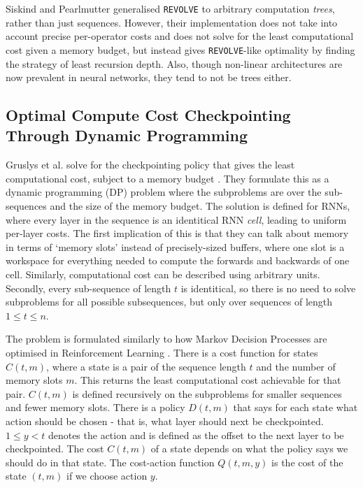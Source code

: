 Siskind and Pearlmutter \cite{Siskind2018} generalised \texttt{REVOLVE} to arbitrary computation \textit{trees}, rather than just sequences.
However, their implementation does not take into account precise per-operator costs and does not solve for the least computational cost given a memory budget, but instead gives \texttt{REVOLVE}-like optimality by finding the strategy of least recursion depth.
Also, though non-linear architectures are now prevalent in neural networks, they tend to not be trees either.

\subsection{Optimal Compute Cost Checkpointing Through Dynamic Programming} \label{sec:2-5-dp-checkpointing}
Gruslys et al. solve for the checkpointing policy that gives the least computational cost, subject to a memory budget \cite{Gruslys2016}.
They formulate this as a dynamic programming (DP) problem where the subproblems are over the sub-sequences and the size of the memory budget.
The solution is defined for RNNs, where every layer in the sequence is an identitical RNN \textit{cell}, leading to uniform per-layer costs.
The first implication of this is that they can talk about memory in terms of `memory slots' instead of precisely-sized buffers, where one slot is a workspace for everything needed to compute the forwards and backwards of one cell.
Similarly, computational cost can be described using arbitrary units.
Secondly, every sub-sequence of length \(t\) is identitical, so there is no need to solve subproblems for all possible subsequences, but only over sequences of length \(1\leq t\leq n\).

The problem is formulated similarly to how Markov Decision Processes are optimised in Reinforcement Learning \cite{Bellman1954, Sutton1998}.
There is a cost function for states \(C(t, m)\), where a state is a pair of the sequence length \(t\) and the number of memory slots \(m\).
This returns the least computational cost achievable for that pair.
\(C(t, m)\) is defined recursively on the subproblems for smaller sequences and fewer memory slots.
There is a policy \(D(t, m)\) that says for each state what action should be chosen - that is, what layer should next be checkpointed. \(1 \leq y < t\) denotes the action and is defined as the offset to the next layer to be checkpointed.
The cost \(C(t, m)\) of a state depends on what the policy says we should do in that state.
The cost-action function \(Q(t, m, y)\) is the cost of the state \((t, m)\) if we choose action \(y\).

